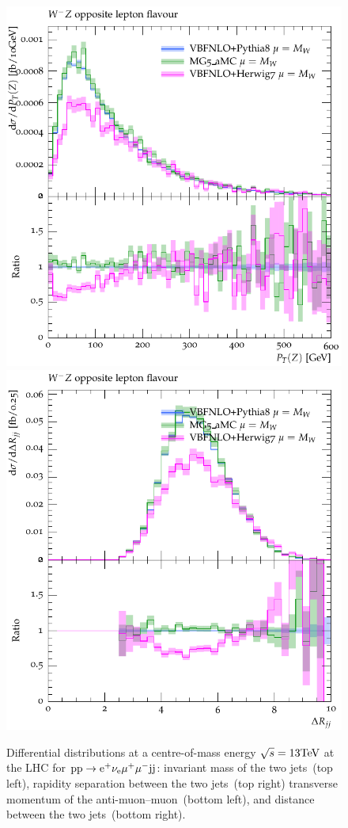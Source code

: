 \documentclass[11pt]{cernrep}
\begin{document}
\begin{figure}[htbp]
\begin{center}
   \includegraphics[scale=0.5]{figs/VBFNLO_WmZ_OF_ZPt}
   \includegraphics[scale=0.5]{figs/VBFNLO_WmZ_OF_dRjj}
\caption{Differential distributions at a centre-of-mass energy $\sqrt{s}=13{\rm TeV}$ at the LHC for ${\rm p} {\rm p} \to {\rm e}^+  \nu_{\rm e}  \mu^+ \mu^- {\rm j} {\rm j}$: 
                invariant mass of the two jets~(top left),
                rapidity separation between the two jets~(top right)
                transverse momentum of the anti-muon--muon~(bottom left), and
                distance between the two jets~(bottom right).}
\label{vbs_fig_shower_1a}
\end{center}
\end{figure}
\end{document}
